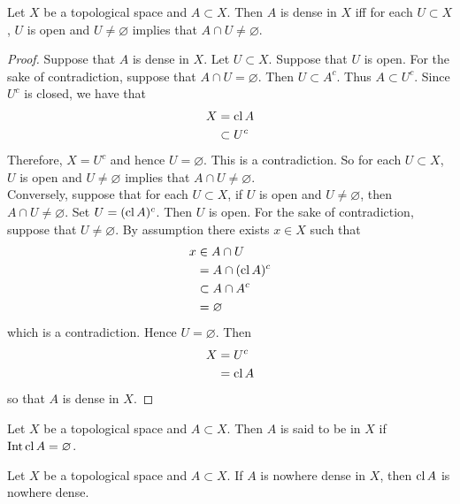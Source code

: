 \documentclass{book}
\begin{document}
	\begin{ex}  
		Let $X$ be a topological space and $A \subset X$. Then $A$ is dense in $X$ iff for each $U \subset X$, $U$ is open and $U \neq \varnothing$ implies that $A \cap U \neq \varnothing$.
	\end{ex}

	\begin{proof}
		Suppose that $A$ is dense in $X$. Let $U \subset X$. Suppose that $U$ is open. For the sake of contradiction, suppose that  $A \cap U = \varnothing$. Then $U \subset A^c$. Thus $A \subset U^c$. Since $U^c$ is closed, we have that  
		\begin{align*}
			X
			& = \operatorname{cl} A \\
			& \subset U^c
		\end{align*}
		Therefore, $X = U^c$ and hence $U = \varnothing$. This is a contradiction. So for each $U \subset X$, $U$ is open and $U \neq \varnothing$ implies that $A \cap U \neq \varnothing$. \\
		Conversely, suppose that for each $U \subset X$, if $U$ is open and $U \neq \varnothing$, then $A \cap U \neq \varnothing$. Set $U =(\operatorname{cl} A)^c$. Then $U$ is open. For the sake of contradiction, suppose that $U \neq \varnothing$. By assumption there exists $x \in X$ such that 
		\begin{align*}
			x 
			& \in A \cap U \\
			& = A \cap (\operatorname{cl} A)^c \\
			& \subset A \cap A^c \\
			& = \varnothing
		\end{align*}
		which is a contradiction. Hence $U = \varnothing$. Then 
		\begin{align*}
			X
			& = U^c \\
			& = \operatorname{cl} A \\
		\end{align*}
		so that $A$ is dense in $X$.
	\end{proof}

	\begin{defn}  
		Let $X$ be a topological space and $A \subset X$. Then $A$ is said to be  in $X$ if $\operatorname{Int} \operatorname{cl} A = \varnothing$. 
	\end{defn}

	\begin{ex}  
		Let $X$ be a topological space and $A \subset X$. If $A$ is nowhere dense in $X$, then $\operatorname{cl} A$ is nowhere dense.
	\end{ex}
	
\end{document}
